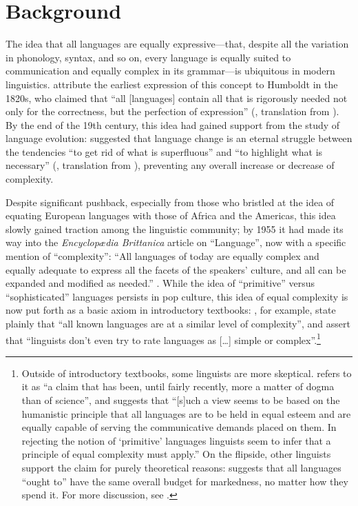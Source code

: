 \documentclass[12pt,twoside]{article}
\begin{document}
\section{Background}
\label{sec:bg}

The idea that all languages are equally expressive---that, despite all the variation in phonology, syntax, and so on, every language is equally suited to communication and equally complex in its grammar---is ubiquitous in modern linguistics. \citet{joseph} attribute the earliest expression of this concept to Humboldt in the 1820s, who claimed that ``all [languages] contain all that is rigorously needed not only for the correctness, but the perfection of expression'' (\cite[8]{rémusat}, translation from \cite[344]{joseph}). By the end of the 19th century, this idea had gained support from the study of language evolution: \citet{passy} suggested that language change is an eternal struggle between the tendencies ``to get rid of what is superfluous'' and ``to highlight what is necessary'' (\cite[227]{passy}, translation from \cite[352]{joseph}), preventing any overall increase or decrease of complexity.

Despite significant pushback, especially from those who bristled at the idea of equating European languages with those of Africa and the Americas, this idea slowly gained traction among the linguistic community; by 1955 it had made its way into the \emph{Encyclopædia Brittanica} article on ``Language'', now with a specific mention of ``complexity'': ``All languages of today are equally complex and equally adequate to express all the facets of the speakers’ culture, and all can be expanded and modified as needed.'' \citep[698]{trager}. While the idea of ``primitive'' versus ``sophisticated'' languages persists in pop culture, this idea of equal complexity is now put forth as a basic axiom in introductory textbooks: \citet[8]{akmajian}, for example, state plainly that ``all known languages are at a similar level of complexity'', and \citet[8]{ogrady} assert that ``linguists don't even try to rate languages as [\ldots] simple or complex''.\footnote{Outside of introductory textbooks, some linguists are more skeptical. \citet[2]{shosted} refers to it as ``a claim that has been, until fairly recently, more a matter of dogma than of science'', and \citet[216]{maddieson} suggests that ``[s]uch a view seems to be based on the humanistic principle that all languages are to be held in equal esteem and are equally capable of serving the communicative demands placed on them. In rejecting the notion of `primitive' languages linguists seem to infer that a principle of equal complexity must apply.'' On the flipside, other linguists support the claim for purely theoretical reasons: \citet[165-166]{chomsky} suggests that all languages ``ought to'' have the same overall budget for markedness, no matter how they spend it. For more discussion, see \citet{joseph}.}
\end{document}
